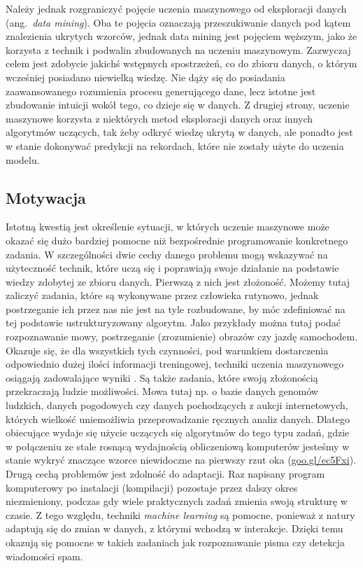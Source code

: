 \documentclass[12pt,a4paper,twoside,openany]{book}
\begin{document}
Należy jednak rozgraniczyć pojęcie uczenia maszynowego od eksploracji danych (ang.~\textit{data mining}). Oba te pojęcia oznaczają przeszukiwanie danych pod kątem znalezienia ukrytych wzorców, jednak data mining jest pojęciem węższym, jako że korzysta z technik i podwalin zbudowanych na uczeniu maszynowym. Zazwyczaj celem jest zdobycie jakichś wstępnych spostrzeżeń, co do zbioru danych, o którym wcześniej posiadano niewielką wiedzę. Nie dąży się do posiadania zaawansowanego rozumienia procesu generującego dane, lecz istotne jest zbudowanie intuicji wokół tego, co dzieje się w danych. Z drugiej strony, uczenie maszynowe korzysta z niektórych metod eksploracji danych oraz innych algorytmów uczących, tak żeby odkryć wiedzę ukrytą w danych, ale ponadto jest w stanie dokonywać predykcji na rekordach, które nie zostały użyte do uczenia modelu.


\subsection{Motywacja}
Istotną kwestią jest określenie sytuacji, w których uczenie maszynowe może okazać się dużo bardziej pomocne niż bezpośrednie programowanie konkretnego zadania. W szczególności dwie cechy danego problemu mogą wskazywać na użyteczność technik, które uczą się i poprawiają swoje działanie na podstawie wiedzy zdobytej ze zbioru danych. Pierwszą z nich jest złożoność. Możemy tutaj zaliczyć zadania, które są wykonywane przez człowieka rutynowo, jednak postrzeganie ich przez nas nie jest na tyle rozbudowane, by móc zdefiniować na tej podstawie ustrukturyzowany algorytm. Jako przykłady można tutaj podać rozpoznawanie mowy, postrzeganie (zrozumienie) obrazów czy jazdę samochodem. Okazuje się, że dla wszystkich tych czynności, pod warunkiem dostarczenia odpowiednio dużej ilości informacji treningowej, techniki uczenia maszynowego osiągają zadowalające wyniki \citep[][]{hinton2012,ciregan2012,ajaykumar2016}. Są także zadania, które swoją złożonością przekraczają ludzie możliwości. Mowa tutaj np. o bazie danych genomów ludzkich, danych pogodowych czy danych pochodzących z aukcji internetowych, których wielkość uniemożliwia przeprowadzanie ręcznych analiz danych. Dlatego obiecujące wydaje się użycie uczących się algorytmów do tego typu zadań, gdzie w połączeniu ze stale rosnącą wydajnością obliczeniową komputerów jesteśmy w stanie wykryć znaczące wzorce niewidoczne na pierwszy rzut oka (\url{goo.gl/ec5Fxi}). Drugą cechą problemów jest zdolność do adaptacji. Raz napisany program komputerowy po instalacji (kompilacji) pozostaje przez dalszy okres niezmieniony, podczas gdy wiele praktycznych zadań zmienia swoją strukturę w czasie. Z tego względu, techniki \textit{machine learning} są pomocne, ponieważ z natury adaptują się do zmian w danych, z którymi wchodzą w interakcje. Dzięki temu okazują się pomocne w takich zadaniach jak rozpoznawanie pisma \citep{bottou1994} czy detekcja wiadomości spam.  
\end{document}
